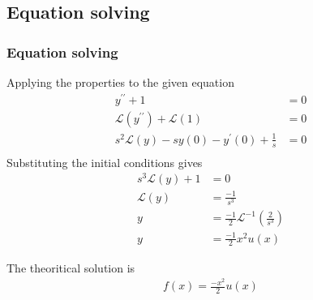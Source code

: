 \documentclass{beamer}
\providecommand{\brak}[1]{\ensuremath{\left(#1\right)}}
\theoremstyle{remark}
\numberwithin{equation}{section}
\begin{document}
\subsection{Equation solving}
\begin{frame}
\frametitle{Equation solving}
Applying the properties to the given equation
\begin{align}
	y^{\prime\prime} + 1 &= 0\\
	\mathcal{L}\brak{y^{\prime\prime}} + \mathcal{L}\brak{1} &= 0\\
	s^2\mathcal{L}\brak{y} -sy\brak{0}-y^\prime\brak{0}+\frac{1}{s} &= 0\\
\end{align}
Substituting the initial conditions gives
\begin{align}
	s^3\mathcal{L}\brak{y} + 1 &= 0\\
	\mathcal{L}\brak{y} &= \frac{-1}{s^3}\\
	y &= \frac{-1}{2}\mathcal{L}^{-1}\brak{\frac{2}{s^3}}\\
	y &= \frac{-1}{2}x^2u\brak{x}
\end{align}
\end{frame}
\begin{frame}
The theoritical solution is 
\begin{align}
	f\brak{x} = \frac{-x^2}{2}u\brak{x}
\end{align}
\end{frame}
\end{document}
